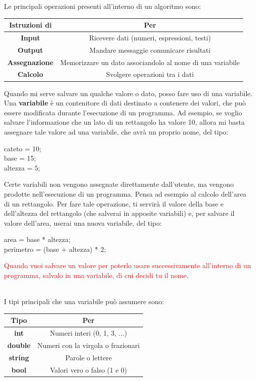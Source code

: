 \documentclass{article}
\begin{document}
	Le principali operazioni presenti all'interno di un algoritmo sono:\\
	\begin{center}
		\begin{tabular}[h!]{|c|c|}
			\hline
			Istruzioni di & Per \\ \hline
			\textbf{Input} & Ricevere dati (numeri, espressioni, testi) \\ \hline
			\textbf{Output} & Mandare messaggie  comunicare risultati \\ \hline
			\textbf{Assegnazione} & Memorizzare un dato associandolo al nome di una variabile \\ \hline
			\textbf{Calcolo} & Svolgere operazioni tra i dati \\
			\hline
		\end{tabular}
	\end{center}
	Quando mi serve salvare un qualche valore o dato, posso fare uso di una variabile. Una \textbf{variabile} è un contenitore di dati destinato a contenere dei valori, che può essere modificata durante l'esecuzione di un programma. Ad esempio, se voglio salvare l'informazione che un lato di un rettangolo ha valore 10, allora mi basta assegnare tale valore ad una variabile, che avrà un proprio nome, del tipo:\\
	\begin{center}
		cateto = 10;\\
		base = 15;\\
		altezza = 5;
	\end{center}
	Certe variabili non vengono assegnate direttamente dall'utente, ma vengono prodotte nell'esecuzione di un programma. Pensa ad esempio al calcolo dell'area di un rettangolo. Per fare tale operazione, ti servirà il valore della base e dell'altezza del rettangolo (che salverai in apposite variabili) e, per salvare il valore dell'area, userai una nuova variabile, del tipo:\\
	\begin{center}
		area = base * altezza;\\
		perimetro = (base + altezza) * 2;
	\end{center}
	\begin{large}
	\textcolor{red}{Quando vuoi salvare un valore per poterlo usare successivamente all'interno di un programma, salvalo in una variabile, di cui decidi tu il nome}.
	\end{large}\\
	I tipi principali che una variabile può assumere sono:\\
	\begin{center}
		\begin{tabular}[h!]{|c|c|}
			\hline
			Tipo & Per \\ \hline
			\textbf{int} & Numeri interi (0, 1, 3, ...) \\ \hline
			\textbf{double} & Numeri con la virgola o frazionari \\ \hline
			\textbf{string} & Parole o lettere \\ \hline
			\textbf{bool} & Valori vero o falso (1 e 0) \\ \hline
		\end{tabular}
	\end{center}
\end{document}
